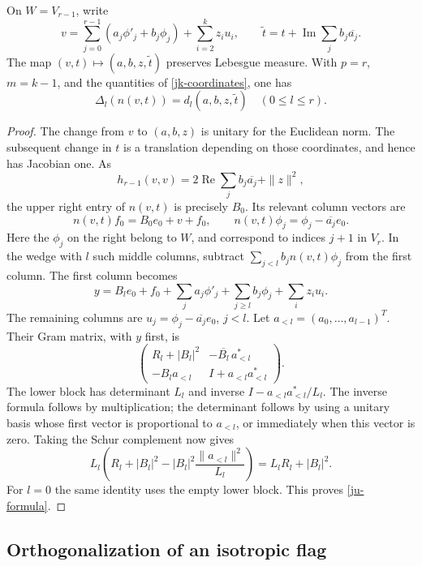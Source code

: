 \begin{lemma}\label{ju-coordinate-formula}
On \(W=V_{r-1}\), write
\[
 v=\sum_{j=0}^{r-1}(a_j\phi'_j+b_j\phi_j)
                        +\sum_{i=2}^{k}z_i u_i,\qquad
 \widetilde t=t+\operatorname{Im}\sum_jb_j\overline{a_j}.
\]
The map \((v,t)\mapsto(a,b,z,\widetilde t)\) preserves
Lebesgue measure.  With \(p=r\), \(m=k-1\), and the
quantities of \eqref{jk-coordinates}, one has
\begin{equation}\label{ju-formula}
 \Delta_l(n(v,t))=d_l(a,b,z,\widetilde t)
                                      \quad(0\leq l\leq r).
\end{equation}
\end{lemma}

\begin{proof}
The change from \(v\) to \((a,b,z)\) is unitary for the
Euclidean norm.  The subsequent change in \(t\) is a translation
depending on those coordinates, and hence has Jacobian one.
As
\[
 h_{r-1}(v,v)=
         2\operatorname{Re}\sum_jb_j\overline{a_j}+\|z\|^2,
\]
the upper right entry of \(n(v,t)\) is precisely \(B_0\).
Its relevant column vectors are
\[
 n(v,t)f_0=B_0e_0+v+f_0,\qquad
 n(v,t)\phi_j=\phi_j-\overline{a_j}e_0.
\]
Here the \(\phi_j\) on the right belong to \(W\), and correspond
to indices \(j+1\) in \(V_r\).
In the wedge with \(l\) such middle columns, subtract
\(\sum_{j<l}b_jn(v,t)\phi_j\) from the first column.
The first column becomes
\[
 y=B_le_0+f_0+\sum_j a_j\phi'_j+
                   \sum_{j\geq l}b_j\phi_j+\sum_i z_i u_i.
\]
The remaining columns are \(u_j=\phi_j-\overline{a_j}e_0\),
\(j<l\).
Let \(a_{<l}=(a_0,\ldots,a_{l-1})^T\).
Their Gram matrix, with \(y\) first, is
\[
 \begin{pmatrix}
 R_l+|B_l|^2&-\overline{B_l}\,a_{<l}^*\\
 -B_l a_{<l}&I+a_{<l}a_{<l}^*
 \end{pmatrix}.
\]
The lower block has determinant \(L_l\) and inverse
\(I-a_{<l}a_{<l}^*/L_l\).
The inverse formula follows by multiplication; the determinant
follows by using a unitary basis whose first vector is proportional
to \(a_{<l}\), or immediately when this vector is zero.
Taking the Schur complement now gives
\[
 L_l\left(R_l+|B_l|^2
       -|B_l|^2\frac{\|a_{<l}\|^2}{L_l}\right)
                                  =L_lR_l+|B_l|^2.
\]
For \(l=0\) the same identity uses the empty lower block.
This proves \eqref{ju-formula}.
\end{proof}

\subsection{Orthogonalization of an isotropic flag}

